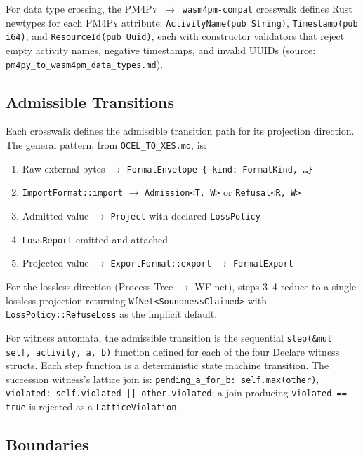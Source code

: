 For data type crossing, the \textsc{PM4Py}~$\to$~\texttt{wasm4pm-compat} crosswalk defines Rust
newtypes for each \textsc{PM4Py} attribute: \texttt{ActivityName(pub String)},
\texttt{Timestamp(pub i64)}, and \texttt{ResourceId(pub Uuid)}, each with constructor validators
that reject empty activity names, negative timestamps, and invalid \textsc{UUID}s (source:
\texttt{pm4py\_to\_wasm4pm\_data\_types.md}).

\subsection{Admissible Transitions}
\label{sec:crosswalks-arch-transitions}

Each crosswalk defines the admissible transition path for its projection direction. The general
pattern, from \texttt{OCEL\_TO\_XES.md}, is:
\begin{enumerate}
  \item Raw external bytes $\to$ \texttt{FormatEnvelope \{ kind: FormatKind, \ldots \}}
  \item \texttt{ImportFormat::import} $\to$ \texttt{Admission<T, W>} or \texttt{Refusal<R, W>}
  \item Admitted value $\to$ \texttt{Project} with declared \texttt{LossPolicy}
  \item \texttt{LossReport} emitted and attached
  \item Projected value $\to$ \texttt{ExportFormat::export} $\to$ \texttt{FormatExport}
\end{enumerate}

For the lossless direction (Process Tree $\to$ WF-net), steps 3--4 reduce to a single lossless
projection returning \texttt{WfNet<SoundnessClaimed>} with \texttt{LossPolicy::RefuseLoss} as
the implicit default.

For witness automata, the admissible transition is the sequential \texttt{step(\&mut self, activity,
a, b)} function defined for each of the four Declare witness structs. Each step function is a
deterministic state machine transition. The succession witness's lattice join is:
\texttt{pending\_a\_for\_b: self.max(other)}, \texttt{violated: self.violated || other.violated};
a join producing \texttt{violated == true} is rejected as a \texttt{LatticeViolation}.

\subsection{Boundaries}
\label{sec:crosswalks-arch-boundaries}

